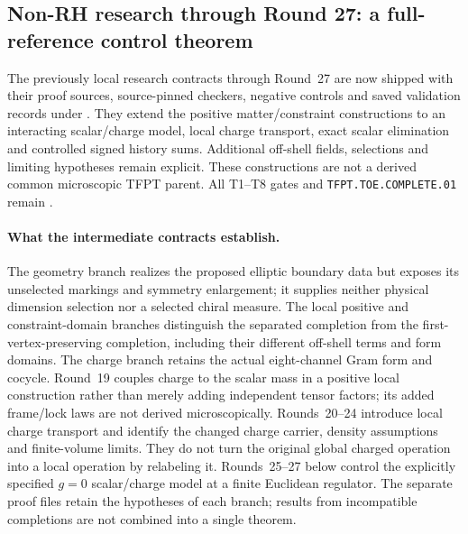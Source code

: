 \subsection*{Non-RH research through Round 27: a full-reference control theorem}
\label{sec:toe-r27-reference}

\begin{keybox}
The previously local research contracts through Round~27 are now shipped
with their proof sources, source-pinned checkers, negative controls and
saved validation records under .
They extend the positive matter/constraint constructions to an interacting
scalar/charge model, local charge transport, exact scalar elimination and
controlled signed history sums. Additional off-shell fields, selections
and limiting hypotheses remain explicit. These constructions are not a
derived common microscopic TFPT parent. All T1--T8 gates and
\texttt{TFPT.TOE.COMPLETE.01} remain \mO.
\end{keybox}

\paragraph{What the intermediate contracts establish.}
The geometry branch realizes the proposed elliptic boundary data but
exposes its unselected markings and symmetry enlargement; it supplies
neither physical dimension selection nor a selected chiral measure.
The local positive and constraint-domain branches distinguish the
separated completion from the first-vertex-preserving completion, including
their different off-shell terms and form domains. The charge branch retains
the actual eight-channel Gram form and cocycle. Round~19 couples charge to
the scalar mass in a positive local construction rather than merely adding
independent tensor factors; its added frame/lock laws are not derived
microscopically. Rounds~20--24 introduce local charge transport and identify
the changed charge carrier, density assumptions and finite-volume limits.
They do not turn the original global charged operation into a local
operation by relabeling it. Rounds~25--27 below control the explicitly
specified $g=0$ scalar/charge model at a finite Euclidean regulator.
The separate proof files retain the hypotheses of each branch; results
from incompatible completions are not combined into a single theorem.


